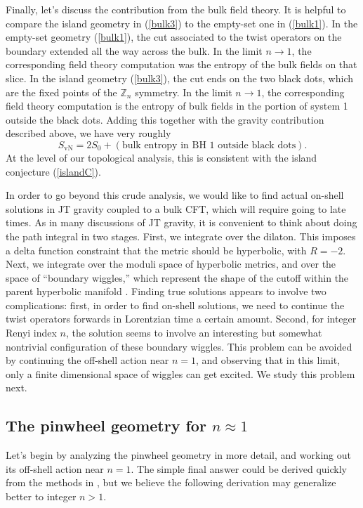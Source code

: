 \documentclass[12pt]{article}
\newcommand{\be}{\begin{equation}}
\newcommand{\ee}{\end{equation}}
\numberwithin{equation}{section}
\begin{document}
Finally, let's discuss the contribution from the bulk field theory. It is helpful to compare the island geometry in (\ref{bulk3}) to the empty-set one in (\ref{bulk1}). In the empty-set geometry (\ref{bulk1}), the cut associated to the twist operators on the boundary extended all the way across the bulk. In the limit $n\rightarrow 1$, the corresponding field theory computation was the entropy of the bulk fields on that slice. In the island geometry (\ref{bulk3}), the cut ends on the two black dots, which are the fixed points of the $\mathbb{Z}_n$ symmetry. In the limit $n\rightarrow 1$, the corresponding field theory computation is the entropy of bulk fields in the portion of system 1 outside the black dots. Adding this together with the gravity contribution described above, we have very roughly
\be
S_{\text{vN}} =  2S_0 + (\text{bulk entropy in BH 1 outside black dots}).
\ee
At the level of our topological analysis, this is consistent with the island conjecture (\ref{islandC}).

In order to go beyond this crude analysis, we would like to find actual on-shell solutions in JT gravity coupled to a bulk CFT, which will require going to late times. As in many discussions of JT gravity, it is convenient to think about doing the path integral in two stages. First, we integrate over the dilaton. This imposes a delta function constraint that the metric should be hyperbolic, with $R = -2$. Next, we integrate over the moduli space of hyperbolic metrics, and over the space of ``boundary wiggles,'' which represent the shape of the cutoff within the parent hyperbolic manifold \cite{Maldacena:2019cbz}. Finding true solutions appears to involve two complications: first, in order to find on-shell solutions, we need to continue the twist operators forwards in Lorentzian time a certain amount. Second, for integer Renyi index $n$, the solution seems to involve an interesting but somewhat nontrivial configuration of these boundary wiggles. This problem can be avoided by continuing the off-shell action near $n = 1$, and observing that in this limit, only a finite dimensional space of wiggles can get excited. We study this problem next.

\subsection{The pinwheel geometry for \texorpdfstring{$n \approx 1$}{n near 1}}
Let's begin by analyzing the pinwheel geometry in more detail, and working out its off-shell action near $n = 1$. The simple final answer could be derived quickly from the methods in \cite{Lewkowycz:2013nqa,Dong:2017xht}, but we believe the following derivation may generalize better to integer $n >1$.
\end{document}
